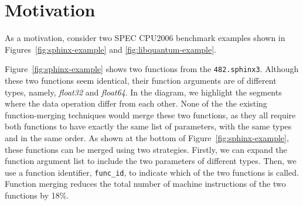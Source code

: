 \section{Motivation} \label{sec:motivation}


As a motivation, consider two SPEC CPU2006 benchmark examples shown in Figures~\ref{fig:sphinx-example} and \ref{fig:libquantum-example}.


Figure~\ref{fig:sphinx-example} shows two functions from the \texttt{482.sphinx3}. Although these two functions seem identical, their
function arguments are of different types, namely, \textit{float32} and \textit{float64}. In the diagram, we highlight the segments where
the data operation differ from each other. None of the the existing function-merging techniques would merge these two functions, as they
all require both functions to have exactly the same list of parameters, with the same types and in the same order. As shown at the bottom
of Figure~\ref{fig:sphinx-example}, these functions can be merged using two strategies. Firstly, we can expand the function argument list
to include the two parameters of different types. Then, we use a function identifier, \texttt{func\_id}, to indicate which of the two
functions is called. Function merging reduces the total number of machine instructions of the two functions by 18\%.


